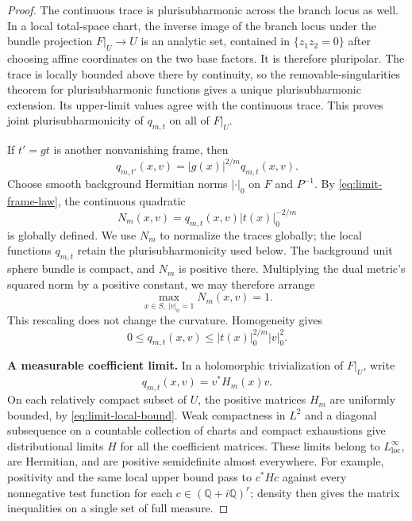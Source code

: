 \begin{proof}
The continuous trace is plurisubharmonic across the branch locus as
well. In a local total-space chart, the inverse image of the branch locus
under the bundle projection $F|_U\to U$ is an analytic set, contained in
$\{z_1z_2=0\}$ after choosing affine
coordinates on the two base factors. It is therefore pluripolar.
The trace is locally bounded above there by continuity, so the
removable-singularities theorem for plurisubharmonic functions
\cite[Chapter~I, Theorem~5.24]{DemaillyCADG} gives a unique
plurisubharmonic extension. Its upper-limit values agree with the
continuous trace. This proves joint plurisubharmonicity of $q_{m,t}$
on all of $F|_U$.

If $t'=gt$ is another nonvanishing frame, then
\begin{equation}\label{eq:limit-frame-law}
q_{m,t'}(x,v)=|g(x)|^{2/m}q_{m,t}(x,v).
\end{equation}
Choose smooth background Hermitian norms $|\cdot|_0$ on $F$ and
$P^{-1}$.  By \eqref{eq:limit-frame-law}, the continuous quadratic
\[
N_m(x,v)=q_{m,t}(x,v)|t(x)|_0^{-2/m}
\]
is globally defined. We use $N_m$ to normalize the traces globally;
the local functions $q_{m,t}$ retain the plurisubharmonicity used
below. The background unit sphere bundle is compact,
and $N_m$ is positive there.  Multiplying the dual metric's squared
norm by a positive constant, we may therefore arrange
\begin{equation}\label{eq:limit-normalization}
\max_{x\in S,\ |v|_0=1}N_m(x,v)=1.
\end{equation}
This rescaling does not change the curvature.  Homogeneity gives
\begin{equation}\label{eq:limit-local-bound}
0\le q_{m,t}(x,v)\le |t(x)|_0^{2/m}|v|_0^2.
\end{equation}

\smallskip\noindent\textbf{A measurable coefficient limit.}
In a holomorphic trivialization of $F|_U$, write
\[
q_{m,t}(x,v)=v^*H_m(x)v.
\]
On each relatively compact subset of $U$, the positive matrices $H_m$
are uniformly bounded, by \eqref{eq:limit-local-bound}.  Weak compactness
in $L^2$ and a diagonal subsequence on a countable collection of charts
and compact exhaustions give distributional limits $H$ for all the
coefficient matrices.  These limits belong to $L^\infty_{\mathrm{loc}}$,
are Hermitian, and are positive semidefinite almost everywhere.  For
example, positivity and the same local upper bound pass to
$c^*Hc$ against every nonnegative test function for each
$c\in(\mathbb Q+i\mathbb Q)^r$; density then gives the matrix
inequalities on a single set of full measure.


\end{proof}
